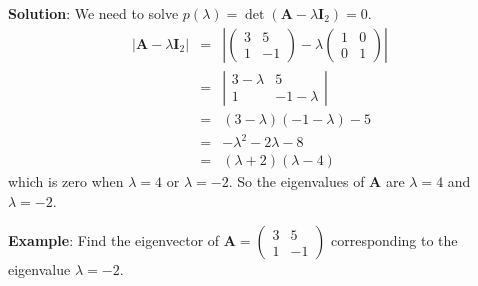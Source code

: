 {\bf Solution}: We need to solve $p(\lambda) = \det(\mathbf{A }- \lambda\mathbf{I}_2) = 0$. 
\[ \begin{array} {lcl}  | \mathbf{A }- \lambda\mathbf{I}_2 |  &= &   \left\vert \left(\begin{array}{ll}3 & 5\\1&-1\end{array}\right) - \lambda  \left(\begin{array}{ll}1 & 0\\0&1\end{array}\right) \right\vert \\
& = &   \left\vert \begin{array}{ll}3-\lambda & 5\\1&-1 - \lambda\end{array}  \right\vert \\
& = & (3-\lambda)(-1 - \lambda) - 5  \\
& = &  - \lambda^2 -2\lambda  -8 \\
& = & (\lambda + 2 )(\lambda - 4 )
\end{array}
\]
which is zero when $\lambda = 4$ or $\lambda = -2$. So the eigenvalues of $\mathbf A$ are $\lambda = 4$ and $\lambda = -2$.  \sqend


{\bf Example}: Find the eigenvector of $\mathbf  A = \left(\begin{array}{ll}3 & 5\\1&-1\end{array}\right) $ corresponding to the eigenvalue $\lambda = -2$.

